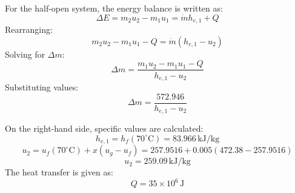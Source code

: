 For the half-open system, the energy balance is written as:  
\[
\Delta E = m_2 u_2 - m_1 u_1 = \dot{m} h_{e,1} + Q
\]  
Rearranging:  
\[
m_2 u_2 - m_1 u_1 - Q = \dot{m} (h_{e,1} - u_2)
\]  
Solving for \( \Delta m \):  
\[
\Delta m = \frac{m_1 u_2 - m_1 u_1 - Q}{h_{e,1} - u_2}
\]  
Substituting values:  
\[
\Delta m = \frac{572.946}{h_{e,1} - u_2}
\]  

On the right-hand side, specific values are calculated:  
\[
h_{e,1} = h_f(70^\circ\text{C}) = 83.966 \, \text{kJ/kg}
\]  
\[
u_2 = u_f(70^\circ\text{C}) + x(u_g - u_f) = 257.9516 + 0.005(472.38 - 257.9516)
\]  
\[
u_2 = 259.09 \, \text{kJ/kg}
\]  
The heat transfer is given as:  
\[
Q = 35 \times 10^6 \, \text{J}
\]